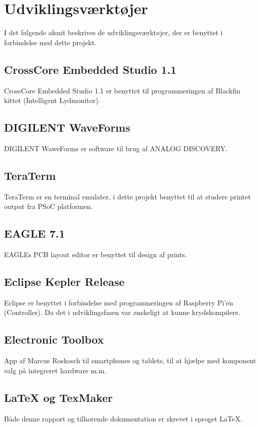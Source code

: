 \chapter{Udviklingsværktøjer}
I det følgende afsnit beskrives de udviklingsværktøjer, der er benyttet i forbindelse med dette projekt. 

\section*{CrossCore Embedded Studio 1.1}
CrossCore Embedded Studio 1.1 er benyttet til programmeringen af Blackfin kittet (Intelligent Lydmonitor).

\section*{DIGILENT WaveForms}
DIGILENT WaweForms er software til brug af ANALOG DISCOVERY.

\section*{TeraTerm}
TeraTerm er en terminal emulater, i dette projekt benyttet til at studere printet output fra PSoC platformen.

\section*{EAGLE 7.1}
EAGLEs PCB layout editor er benyttet til design af prints.

\section*{Eclipse Kepler Release}
Eclipse er benyttet i forbindelse med programmeringen af Raspberry Pi'en (Controller). Da det i udviklingsfasen var ønskeligt at kunne krydskompilere. 

\section*{Electronic Toolbox}
App af Marcus Roskosch til smartphones og tablets, til at hjælpe med komponent valg på integreret hardware m.m.

\section*{LaTeX og TexMaker}
Både denne rapport og tilhørende dokumentation er skrevet i sproget \LaTeX.

